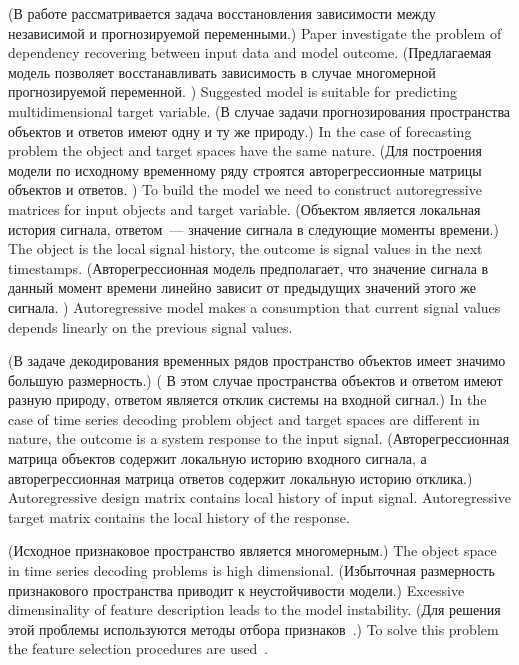 \documentclass[12pt,twoside]{article}
\begin{document}
(В работе рассматривается задача восстановления зависимости между независимой и прогнозируемой переменными.)
Paper investigate the problem of dependency recovering between input data and model outcome.
(Предлагаемая модель позволяет восстанавливать зависимость в случае многомерной прогнозируемой переменной. )
Suggested model is suitable for predicting multidimensional target variable.
(В случае задачи прогнозирования пространства объектов и ответов имеют одну и ту же природу.)
In the case of forecasting problem the object and target spaces have the same nature.
(Для построения модели по исходному временному ряду строятся авторегрессионные матрицы объектов и ответов. )
To build the model we need to construct autoregressive matrices for input objects and target variable.
(Объектом является локальная история сигнала, ответом~--- значение сигнала в следующие моменты времени.)
The object is the local signal history, the outcome is signal values in the next timestamps.
(Авторегрессионная модель предполагает, что значение сигнала в данный момент времени линейно зависит от предыдущих значений этого же сигнала. )
Autoregressive model makes a consumption that current signal values depends linearly on the previous signal values.

(В задаче декодирования временных рядов пространство объектов имеет значимо большую размерность.)
( В этом случае пространства объектов и ответом имеют разную природу, ответом является отклик системы на входной сигнал.) 
In the case of time series decoding problem object and target spaces are different in nature, the outcome is a system response to the input signal.
(Авторегрессионная матрица объектов содержит локальную историю входного сигнала, а авторегрессионная матрица ответов содержит локальную историю отклика.)
Autoregressive design matrix contains local history of input signal.
Autoregressive target matrix contains the local history of the response.

(Исходное признаковое пространство является многомерным.) 
The object space in time series decoding problems is high dimensional.
(Избыточная размерность признакового пространства приводит к неустойчивости модели.)
Excessive dimensinality of feature description leads to the model instability.
(Для решения этой проблемы используются методы отбора признаков~\cite{katrutsa2015qpfs,li2016feature}.)
To solve this problem the feature selection procedures are used~\cite{katrutsa2015qpfs,li2016feature}.
\end{document}
